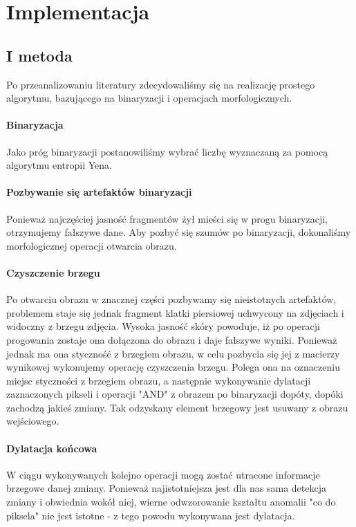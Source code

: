 \documentclass[11pt,openany]{sprawozdanie-agh}
\begin{document}
\section{Implementacja}
\subsection{I metoda}
Po przeanalizowaniu literatury zdecydowaliśmy się na realizację prostego algorytmu, bazującego na binaryzacji i operacjach morfologicznych.

\paragraph{Binaryzacja\\}
Jako próg binaryzacji postanowiliśmy wybrać liczbę wyznaczaną za pomocą algorytmu entropii Yena.

\paragraph{Pozbywanie się artefaktów binaryzacji\\}
Ponieważ najczęściej jasność fragmentów żył mieści się w progu binaryzacji, otrzymujemy fałszywe dane. Aby pozbyć się szumów po binaryzacji, dokonaliśmy morfologicznej operacji otwarcia obrazu.

\paragraph{Czyszczenie brzegu\\}
Po otwarciu obrazu w znacznej części pozbywamy się nieistotnych artefaktów, problemem staje się jednak fragment klatki piersiowej uchwycony na zdjęciach i widoczny z brzegu zdjęcia. Wysoka jasność skóry powoduje, iż po operacji progowania zostaje ona dołączona do obrazu i daje fałszywe wyniki. Ponieważ jednak ma ona styczność z brzegiem obrazu, w celu pozbycia się jej z macierzy wynikowej wykonujemy operację czyszczenia brzegu.
Polega ona na oznaczeniu miejsc styczności z brzegiem obrazu, a następnie wykonywanie dylatacji zaznaczonych pikseli i operacji "AND" z obrazem po binaryzacji dopóty, dopóki zachodzą jakieś zmiany. Tak odzyskany element brzegowy jest usuwany z obrazu wejściowego.

\paragraph{Dylatacja końcowa\\}
W ciągu wykonywanych kolejno operacji mogą zostać utracone informacje brzegowe danej zmiany. Ponieważ najistotniejsza jest dla nas sama detekcja zmiany i obwiednia wokół niej, wierne odwzorowanie kształtu anomalii "co do piksela" nie jest istotne - z tego powodu wykonywana jest dylatacja.
\end{document}
